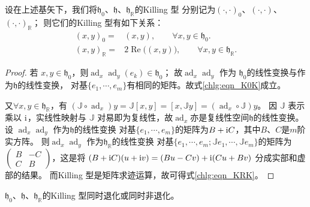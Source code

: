 \begin{proposition}
	设在上述基矢下，我们将$\mathfrak{h}_{0}$、$\mathfrak{h}$、$\mathfrak{h}_{\mathbb{R}}$的Killing 型
	分别记为$(\cdot,\cdot)_0$、$(\cdot,\cdot)$、$(\cdot,\cdot)_{\mathbb{R}}$；
	则它们的Killing 型有如下关系：
	\begin{align}
		(x,y)_0 =& (x,y),\qquad \forall x,y \in \mathfrak{h}_{0}. \label{chlg:eqn_K0K} \\
		(x,y)_{\mathbb{R}} =& 2\operatorname{Re}\bigl((x,y)\bigr),\qquad
		\forall x,y \in \mathfrak{h}_{\mathbb{R}}. \label{chlg:eqn_KRK}
	\end{align}
\end{proposition}
\begin{proof}
若 $x, y \in \mathfrak{h}_0$，则$\operatorname{ad}_x \operatorname{ad}_y (e_k) \in \mathfrak{h}_0$；
故$\operatorname{ad}_x \operatorname{ad}_y$ 作为 $\mathfrak{h}_0$的线性变换与作为$\mathfrak{h}$的线性变换，
对基$\{e_1,\cdots,e_m\}$有相同的矩阵。故式\eqref{chlg:eqn_K0K}成立。

又$\forall x, y \in \mathfrak{h}_{\mathbb{R}}$，有
$(\mathbb{J}\circ \operatorname{ad}_x) y=\mathbb{J}[x, y]=[x, \mathbb{J} y]=(\operatorname{ad}_x \circ \mathbb{J}) y $。
因 $\mathbb J$ 表示乘以 $\mathrm{i}$，实线性映射与 $\mathbb J$ 对易即为复线性，故$\operatorname{ad}_x$亦是复线性空间$\mathfrak{h}$的线性变换。
设 $\operatorname{ad}_x \operatorname{ad}_y$ 作为$\mathfrak{h}$的线性变换
对基$\{e_1,\cdots,e_m\}$的矩阵为$B+\mathrm{i} C$，其中$B$、$C$是$m$阶实方阵。
则$\operatorname{ad}_x \operatorname{ad}_y$ 作为$\mathfrak{h}_{\mathbb{R}}$的线性变换
对基$\{e_1,\cdots,e_m;\mathbb{J}e_1,\cdots,\mathbb{J}e_m\}$的矩阵为
$    \left(\begin{smallmatrix}
    B& -C \\ C & B
\end{smallmatrix}\right)$，这是将 $(B+\mathrm{i} C)(u+\mathrm{i} v)=(Bu-Cv)+\mathrm{i}(Cu+Bv)$ 分成实部和虚部的结果。
而Killing 型是矩阵求迹运算，故可得式\eqref{chlg:eqn_KRK}。
\end{proof}

\begin{proposition}\label{chlg:thm_h0hhR}
    $\mathfrak{h}_0$、$ \mathfrak{h}$、$ \mathfrak{h}_{\mathbb{R}}$的Killing 型同时退化或同时非退化。
\end{proposition}

